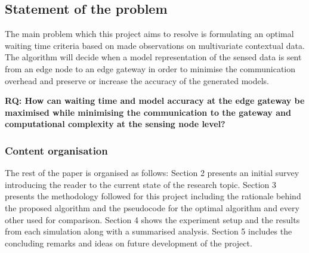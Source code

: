 \documentclass{mpaper}
\begin{document}
\subsection*{Statement of the problem}
The main problem which this project aims to resolve is formulating an optimal waiting time criteria based on made observations on multivariate contextual data. The algorithm will decide when a model representation of the sensed data is sent from an edge node to an edge gateway in order to minimise the communication overhead and preserve or increase the accuracy of the generated models.


\textbf{RQ: How can waiting time and model accuracy at the edge gateway be maximised while minimising the communication to the gateway and computational complexity at the sensing node level?}

\subsubsection*{Content organisation}
The rest of the paper is organised as follows: Section 2 presents an initial survey introducing the reader to the current state of the research topic. Section 3 presents the methodology followed for this project including the rationale behind the proposed algorithm and the pseudocode for the optimal algorithm and every other used for comparison. Section 4 shows the experiment setup and the results from each simulation along with a summarised analysis. Section 5 includes the concluding remarks and ideas on future development of the project.
\end{document}
